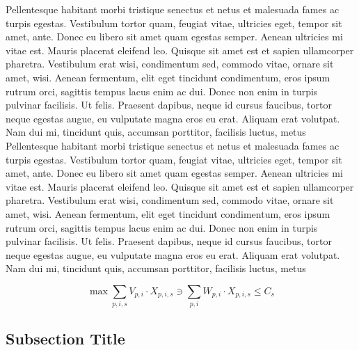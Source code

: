 Pellentesque habitant morbi tristique senectus et netus et malesuada fames ac turpis egestas. Vestibulum tortor quam, feugiat vitae, ultricies eget, tempor sit amet, ante. Donec eu libero sit amet quam egestas semper. Aenean ultricies mi vitae est. Mauris placerat eleifend leo. Quisque sit amet est et sapien ullamcorper pharetra. Vestibulum erat wisi, condimentum sed, commodo vitae, ornare sit amet, wisi. Aenean fermentum, elit eget tincidunt condimentum, eros ipsum rutrum orci, sagittis tempus lacus enim ac dui. Donec non enim in turpis pulvinar facilisis. Ut felis. Praesent dapibus, neque id cursus faucibus, tortor neque egestas augue, eu vulputate magna eros eu erat. Aliquam erat volutpat. Nam dui mi, tincidunt quis, accumsan porttitor, facilisis luctus, metus
Pellentesque habitant morbi tristique senectus et netus et malesuada fames ac turpis egestas. Vestibulum tortor quam, feugiat vitae, ultricies eget, tempor sit amet, ante. Donec eu libero sit amet quam egestas semper. Aenean ultricies mi vitae est. Mauris placerat eleifend leo. Quisque sit amet est et sapien ullamcorper pharetra. Vestibulum erat wisi, condimentum sed, commodo vitae, ornare sit amet, wisi. Aenean fermentum, elit eget tincidunt condimentum, eros ipsum rutrum orci, sagittis tempus lacus enim ac dui. Donec non enim in turpis pulvinar facilisis. Ut felis. Praesent dapibus, neque id cursus faucibus, tortor neque egestas augue, eu vulputate magna eros eu erat. Aliquam erat volutpat. Nam dui mi, tincidunt quis, accumsan porttitor, facilisis luctus, metus

\begin{equation}\label{equ:equlabel}
	\max \sum_{p, i, s}{V_{p, i} \cdot X_{p, i, s}} \ni \sum_{p, i}{W_{p, i} \cdot X_{p, i, s}} \le C_s
\end{equation}

\subsection{Subsection Title}

